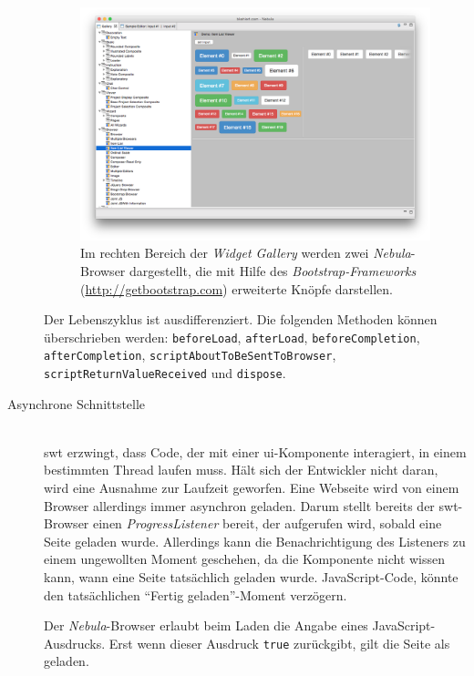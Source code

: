 \begin{description}
  \begin{figure}
    \centering
      \includegraphics[width=1.0\linewidth]{Figures/browser/BrowserList.png}
    \caption[Nebula-Browser mit Bootstrap-Erweiterung]{Im rechten Bereich der \textit{Widget Gallery} werden zwei \textit{Nebula}-Browser dargestellt, die mit Hilfe des \textit{Bootstrap-Frameworks} (\url{http://getbootstrap.com}) erweiterte Knöpfe darstellen.}
    \label{fig:BrowserList}
  \end{figure}
  
  Der Lebenszyklus ist ausdifferenziert. Die folgenden Methoden können überschrieben werden: \texttt{beforeLoad}, \texttt{afterLoad}, \texttt{beforeCompletion}, \texttt{afterCompletion}, \texttt{scriptAboutToBeSentToBrowser}, \texttt{scriptReturnValueReceived} und \texttt{dispose}.
  
  \item[Asynchrone Schnittstelle] \hfill \\
  \gls{swt} erzwingt, dass Code, der mit einer \acrshort{ui}-Komponente interagiert, in einem bestimmten Thread laufen muss. Hält sich der Entwickler nicht daran, wird eine Ausnahme zur Laufzeit geworfen. Eine Webseite wird von einem Browser allerdings immer asynchron geladen. Darum stellt bereits der \gls{swt}-Browser einen \textit{ProgressListener} bereit, der aufgerufen wird, sobald eine Seite geladen wurde. Allerdings kann die Benachrichtigung des Listeners zu einem ungewollten Moment geschehen, da die Komponente nicht wissen kann, wann eine Seite tatsächlich geladen wurde. JavaScript-Code, könnte den tatsächlichen ``Fertig geladen''-Moment verzögern.
  
  Der \textit{Nebula}-Browser erlaubt beim Laden die Angabe eines JavaScript-Ausdrucks. Erst wenn dieser Ausdruck \texttt{true} zurückgibt, gilt die Seite als geladen.
  

\end{description}
